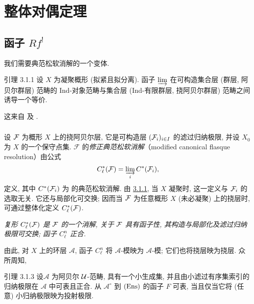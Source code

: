 \section{整体对偶定理}\pageoriginale

\subsection{函子 $Rf^{!}$}

我们需要典范松软消解的一个变体.

\begin{enonce*}{引理 3.1.1}
设 $X$ 为凝聚概形 (\ie 拟紧且拟分离). 函子 $\varinjlim$ 在可构造集合层 (\resp 群层, \resp 阿贝尔群层) 范畴的 Ind-对象范畴与集合层 (\resp Ind-有限群层, \resp 挠阿贝尔群层) 范畴之间诱导一个等价.
\end{enonce*}

这来自  及 .

\setcounter{subsubsection}{1}
\subsubsection{}
设 ${\mathcal F}$ 为概形 $X$ 上的挠阿贝尔层, 它是可构造层 $({\mathcal F}_{i})_{i\in I}$ 的滤过归纳极限, 并设 $X_{0}$ 为 $X$ 的一个保守点集. $\mathcal{F}$ 的\emph{修正典范松软消解}（modified canonical flasque resolution）由公式
$$
C^{\ast}_{\ell}({\mathcal F})=\varinjlim_{i}C^{\ast}({\mathcal F}_{i}){},
$$ 定义, 其中 $C^{\ast}({\mathcal F}_{i})$ 为  的典范松软消解. 由 \hyperref[XVIII.lem3.1.1]{3.1.1}, 当 $X$ 凝聚时, 这一定义与 ${\mathcal F}_{i}$ 的选取无关. 它还与局部化可交换; 因而当 ${\mathcal F}$ 为任意概形 $X$ (未必凝聚) 上的挠层时, 可通过整体化定义 $C^{\ast}_{\ell}({\mathcal F})$.

\emph{复形 $C^{\ast}_{\ell}({\mathcal F})$ 是 ${\mathcal F}$ 的一个消解, 关于 ${\mathcal F}$ 具有函子性, 其构造与局部化及滤过归纳极限可交换; 函子 $C^{n}_{\ell}$ 正合.}

由此, 对 $X$ 上的环层 $\mathcal{A}$, 函子 $C^{n}_{\ell}$ 将 $\mathcal{A}$-模映为 $\mathcal{A}$-模; 它们也将挠层映为挠层. 众所周知,

\begin{enonce*}{引理 3.1.3}
设\pageoriginale $\mathcal{A}$ 为阿贝尔 $\protect\mathcal{\mathcal{U}}$-范畴, 具有一个小生成集, 并且由小滤过有序集索引的归纳极限在 $\mathcal{A}$ 中可表且正合. 从 $\mathcal{A}^{\circ}$ 到 $(\operatorname{Ens})$ 的函子 $F$ 可表, 当且仅当它将 (任意) 小归纳极限映为投射极限.
\end{enonce*}

